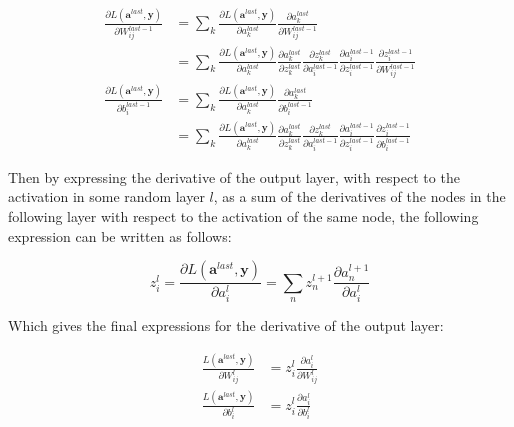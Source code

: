 \documentclass[../main.tex]{subfiles}
\begin{document}
\begin{align}
\frac{\partial L\left(\boldsymbol{a}^{last}, \boldsymbol{y}\right)}{\partial W_{i j}^{last-1}}&=\sum_{k} \frac{\partial L\left(\boldsymbol{a}^{last}, \boldsymbol{y}\right)}{\partial a_{k}^{last}} \frac{\partial a_{k}^{last}}{\partial W_{i j}^{last-1}} \\
&=\sum_{k} \frac{\partial L\left(\boldsymbol{a}^{last}, \boldsymbol{y}\right)}{\partial a_{k}^{last}} \frac{\partial a_{k}^{last}}{\partial z_{k}^{last}} \frac{\partial z_{k}^{last}}{\partial a_{i}^{last-1}} \frac{\partial a_{i}^{last-1}}{\partial z_{i}^{last-1}} \frac{\partial z_{i}^{last-1}}{\partial W_{i j}^{last-1}}\\
\frac{\partial L\left(\boldsymbol{a}^{last}, \boldsymbol{y}\right)}{\partial b_{i}^{last-1}}&=\sum_{k} \frac{\partial L\left(\boldsymbol{a}^{last}, \boldsymbol{y}\right)}{\partial a_{k}^{last}} \frac{\partial a_{k}^{last}}{\partial b_{i}^{last-1}} \\
&=\sum_{k} \frac{\partial L\left(\boldsymbol{a}^{last}, \boldsymbol{y}\right)}{\partial a_{k}^{last}} \frac{\partial a_{k}^{last}}{\partial z_{k}^{last}} \frac{\partial z_{k}^{last}}{\partial a_{i}^{last-1}} \frac{\partial a_{i}^{last-1}}{\partial z_{i}^{last-1}} \frac{\partial z_{i}^{last-1}}{\partial b_{i}^{last-1}}
\end{align}

Then by expressing the derivative of the output layer, with respect to the activation in some random layer $l$, as a sum of the derivatives of the nodes in the following layer with respect to the activation of the same node, the following expression can be written as follows:

\begin{equation}
    z_i^l= \frac{\partial L(\boldsymbol{a}^{last},\boldsymbol{y})}{\partial a_{i}^l}= \sum_n z_n^{l+1}\frac{\partial a_n^{l+1}}{\partial a_{i}^l}
\end{equation}

Which gives the final expressions for the derivative of the output layer:

\begin{align}
\frac{L\left(\boldsymbol{a}^{last}, \boldsymbol{y}\right)}{\partial W_{i j}^{l}}&=z_{i}^{l} \frac{\partial a_{i}^{l}}{\partial W_{i j}^{l}} \\
\frac{L\left(\boldsymbol{a}^{last}, \boldsymbol{y}\right)}{\partial b_{i}^{l}}&=z_{i}^{l} \frac{\partial a_{i}^{l}}{\partial b_{i}^{l}}
\end{align}
\end{document}

